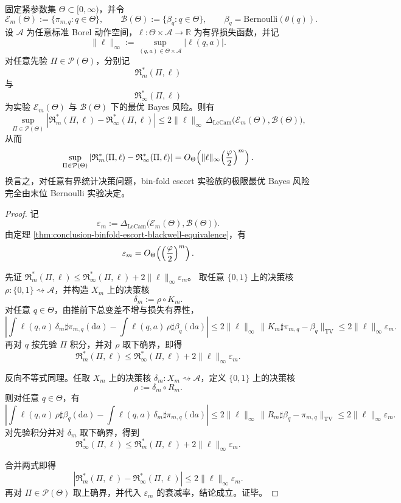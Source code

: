 \begin{theorem}\label{thm:conclusion-binfold-escort-bayes-risk-collapse}
固定紧参数集 \(\Theta\subset[0,\infty)\)，并令
\[
\mathcal E_m(\Theta):=\{\pi_{m,q}:q\in\Theta\},
\qquad
\mathcal B(\Theta):=\{\beta_q:q\in\Theta\},
\qquad
\beta_q=\mathrm{Bernoulli}(\theta(q)).
\]
设 \(\mathcal A\) 为任意标准 Borel 动作空间，\(\ell:\Theta\times\mathcal A\to\mathbb R\) 为有界损失函数，并记
\[
\|\ell\|_\infty:=\sup_{(q,a)\in\Theta\times\mathcal A}|\ell(q,a)|.
\]
对任意先验 \(\Pi\in\mathcal P(\Theta)\)，分别记
\[
\mathfrak R_m^\ast(\Pi,\ell)
\]
与
\[
\mathfrak R_\infty^\ast(\Pi,\ell)
\]
为实验 \(\mathcal E_m(\Theta)\) 与 \(\mathcal B(\Theta)\) 下的最优 Bayes 风险。则有
\[
\sup_{\Pi\in\mathcal P(\Theta)}
\left|
\mathfrak R_m^\ast(\Pi,\ell)-\mathfrak R_\infty^\ast(\Pi,\ell)
\right|
\le
2\|\ell\|_\infty\,
\Delta_{\mathrm{LeCam}}\bigl(\mathcal E_m(\Theta),\mathcal B(\Theta)\bigr),
\]
从而
\[
\sup_{\Pi\in\mathcal P(\Theta)}
\left|
\mathfrak R_m^\ast(\Pi,\ell)-\mathfrak R_\infty^\ast(\Pi,\ell)
\right|
=
O_\Theta\!\left(
\|\ell\|_\infty
\Bigl(\frac{\varphi}{2}\Bigr)^m
\right).
\]
换言之，对任意有界统计决策问题，bin-fold escort 实验族的极限最优 Bayes 风险完全由末位 Bernoulli 实验决定。
\end{theorem}
\begin{proof}
记
\[
\varepsilon_m:=
\Delta_{\mathrm{LeCam}}\bigl(\mathcal E_m(\Theta),\mathcal B(\Theta)\bigr).
\]
由定理 \ref{thm:conclusion-binfold-escort-blackwell-equivalence}，有
\[
\varepsilon_m=
O_\Theta\!\left(\Bigl(\frac{\varphi}{2}\Bigr)^m\right).
\]

先证
\(
\mathfrak R_m^\ast(\Pi,\ell)\le \mathfrak R_\infty^\ast(\Pi,\ell)+2\|\ell\|_\infty\varepsilon_m
\)。
取任意 \(\{0,1\}\) 上的决策核 \(\rho:\{0,1\}\rightsquigarrow\mathcal A\)，并构造 \(X_m\) 上的决策核
\[
\delta_m:=\rho\circ K_m.
\]
对任意 \(q\in\Theta\)，由推前下总变差不增与损失有界性，
\[
\left|
\int\ell(q,a)\,\delta_m\sharp\pi_{m,q}(\mathrm da)
-
\int\ell(q,a)\,\rho\sharp\beta_q(\mathrm da)
\right|
\le
2\|\ell\|_\infty\,
\|K_m\sharp\pi_{m,q}-\beta_q\|_{\mathrm{TV}}
\le
2\|\ell\|_\infty\varepsilon_m.
\]
再对 \(q\) 按先验 \(\Pi\) 积分，并对 \(\rho\) 取下确界，即得
\[
\mathfrak R_m^\ast(\Pi,\ell)\le \mathfrak R_\infty^\ast(\Pi,\ell)+2\|\ell\|_\infty\varepsilon_m.
\]

反向不等式同理。任取 \(X_m\) 上的决策核 \(\delta_m:X_m\rightsquigarrow\mathcal A\)，定义 \(\{0,1\}\) 上的决策核
\[
\rho:=\delta_m\circ R_m.
\]
则对任意 \(q\in\Theta\)，有
\[
\left|
\int\ell(q,a)\,\rho\sharp\beta_q(\mathrm da)
-
\int\ell(q,a)\,\delta_m\sharp\pi_{m,q}(\mathrm da)
\right|
\le
2\|\ell\|_\infty\,
\|R_m\sharp\beta_q-\pi_{m,q}\|_{\mathrm{TV}}
\le
2\|\ell\|_\infty\varepsilon_m.
\]
对先验积分并对 \(\delta_m\) 取下确界，得到
\[
\mathfrak R_\infty^\ast(\Pi,\ell)\le \mathfrak R_m^\ast(\Pi,\ell)+2\|\ell\|_\infty\varepsilon_m.
\]

合并两式即得
\[
\left|
\mathfrak R_m^\ast(\Pi,\ell)-\mathfrak R_\infty^\ast(\Pi,\ell)
\right|
\le
2\|\ell\|_\infty\varepsilon_m.
\]
再对 \(\Pi\in\mathcal P(\Theta)\) 取上确界，并代入 \(\varepsilon_m\) 的衰减率，结论成立。证毕。
\end{proof}

